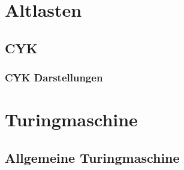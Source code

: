 


\section{Altlasten}
\subsection{CYK}
\begin{frame}
	\frametitle{CYK Darstellungen}
\end{frame}

\section{Turingmaschine}
\subsection{Allgemeine Turingmaschine}
